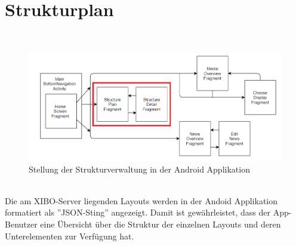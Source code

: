 \section{Strukturplan}
\\
\begin{figure}[H]
\centering
\includegraphics[width=1.0\textwidth]{images/06_AndroidApp/06_AndroidArchStructureCrawler}
\caption{Stellung der Strukturverwaltung in der Android Applikation}
\label{fig:mediaNav}
\end{figure}
\\	
Die am XIBO-Server liegenden Layouts werden in der Andoid Applikation formatiert als ''JSON-Sting'' angezeigt. Damit ist gewährleistet, dass der App-Benutzer eine Übersicht über die Struktur der einzelnen Layouts und deren Unterelementen zur Verfügung hat.
